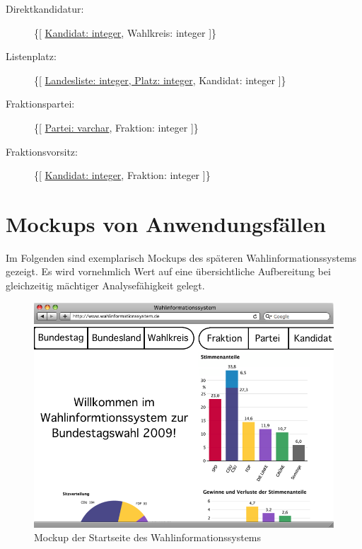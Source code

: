 \documentclass[a4paper]{article}
\begin{document}
\begin{description}

\item[Direktkandidatur:] \{[ \underline{Kandidat: integer}, Wahlkreis: integer ]\}

\item[Listenplatz:] \{[ \underline{Landesliste: integer, Platz: integer}, Kandidat: integer ]\}

\item[Fraktionspartei:] \{[ \underline{Partei: varchar}, Fraktion: integer ]\}

\item[Fraktionsvorsitz:] \{[ \underline{Kandidat: integer}, Fraktion: integer ]\}

\end{description}

\section{Mockups von Anwendungsfällen}

Im Folgenden sind exemplarisch Mockups des späteren Wahlinformationssystems gezeigt. Es wird vornehmlich Wert auf eine übersichtliche Aufbereitung bei gleichzeitig mächtiger Analysefähigkeit gelegt.

\begin{figure}[H!]
\centering
\includegraphics[scale=0.4]{Mockups/startseite}
\caption{Mockup der Startseite des Wahlinformationssystems}
\end{figure}
\end{document}
